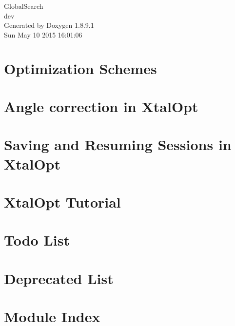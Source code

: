 \documentclass[twoside]{book}
\newcommand{\+}{\discretionary{\mbox{\scriptsize$\hookleftarrow$}}{}{}}
\newcommand{\clearemptydoublepage}{%
  \newpage{\pagestyle{empty}\cleardoublepage}%
}
\begin{document}
\hypersetup{pageanchor=false,
             bookmarks=true,
             bookmarksnumbered=true,
             pdfencoding=unicode
            }
\begin{titlepage}
\vspace*{7cm}
\begin{center}%
{\Large Global\+Search \\[1ex]\large dev }\\
\vspace*{1cm}
{\large Generated by Doxygen 1.8.9.1}\\
\vspace*{0.5cm}
{\small Sun May 10 2015 16:01:06}\\
\end{center}
\end{titlepage}
\clearemptydoublepage
\tableofcontents
\clearemptydoublepage
{}
\hypersetup{pageanchor=true}

\chapter{Optimization Schemes}
\label{optschemes}
\hypertarget{optschemes}{}

\chapter{Angle correction in Xtal\+Opt}
\label{fixAngles}
\hypertarget{fixAngles}{}

\chapter{Saving and Resuming Sessions in Xtal\+Opt}
\label{xo_saveresume}
\hypertarget{xo_saveresume}{}

\chapter{Xtal\+Opt Tutorial}
\label{tut-xo}
\hypertarget{tut-xo}{}

\chapter{Todo List}
\label{todo}
\hypertarget{todo}{}

\chapter{Deprecated List}
\label{deprecated}
\hypertarget{deprecated}{}

\chapter{Module Index}

\end{document}
